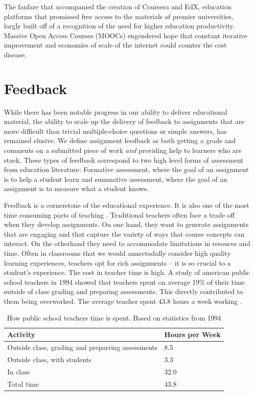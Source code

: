 The fanfare that accompanied the creation of Coursera and EdX, education platforms that promissed free access to the materials of premier universities, largly built off of a recognition of the need for higher education productivity. Massive Open Access Courses (MOOCs) engendered hope that constant iterative
improvement and economies of scale of the internet could counter the cost disease.

\section{Feedback}

While there has been notable progress in our ability to deliver educational material, the ability to scale up the delivery of feedback to assignments that are more difficult than trivial multiple-choice questions or simple answers, has remained elusive. We define assignment feedback as both getting a grade and comments on a submitted piece of work \emph{and} providing help to learners who are stuck. These types of feedback correspond to two high level forms of assessment from education literature: Formative assessment, where the goal of an assignment is to help a student learn and summative assessment, where the goal of an assignment is to measure what a student knows.

Feedback is a cornerstone of the educational experience. It is also one of the most time consuming parts of teaching \cite{sadler2006impact}. Traditional teachers often face a trade off when they develop assignments. On one hand, they want to generate assignments that are engaging and that capture the variety of ways that course concepts can interact. On the otherhand they need to accommodate limitations in resouces and time. Often in classrooms that we would annectodally consider high quality learning experiences, teachers opt for rich assignments -- it is so crucial to a student's experience. The cost in teacher time is high. A study of american public school teachers in 1994 showed that teachers spent on average 19\% of their time outside of class grading and preparing assessments. This directly contributed to them being overworked. The average teacher spent 43.8 hours a week working \cite{henke1996schools}.

\begin{table}[h]
 \centering
 \begin{tabular}{ l l }
 \toprule
	Activity & Hours per Week \\
   \midrule
   Outside class, grading and preparring assessments & 8.5 \\
  Outside class, with students & 3.3 \\
  In class & 32.0 \\
  Total time & 43.8 \\
  \bottomrule
  \end{tabular}
  \caption[Teacher time]{How public school teachers time is spent. Based on statistics from 1994 \cite{henke1996schools}}
 \label{tab:dataTable}
\end{table}

